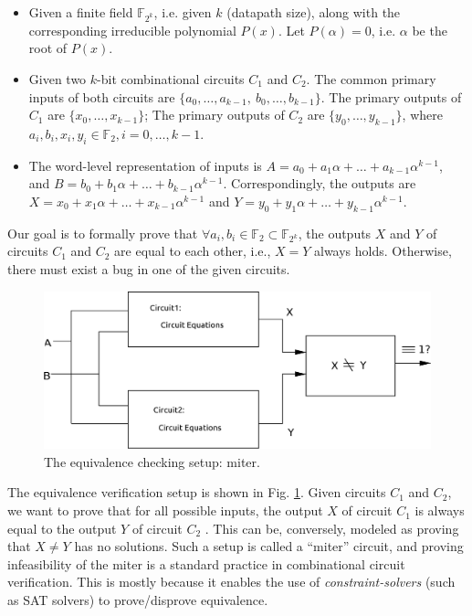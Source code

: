 \begin{itemize}
\item Given a finite field $\mathbb{F}_{2^k}$, i.e. given $k$ (datapath size), along with the
  corresponding irreducible polynomial $P(x)$. Let $P(\alpha) = 0$,
  i.e. $\alpha$ be the root of $P(x)$.   
\item  Given two $k$-bit combinational circuits $C_{1}$ and $C_{2}$. 
		The common primary inputs of both circuits are $\{a_0,
                \dots, a_{k-1}, ~b_0,\dots, b_{k-1}\}$.  
		The primary outputs of $C_{1}$ are $\{x_0, \dots, x_{k-1}\}$;
		The primary outputs of $C_{2}$ are $\{y_0, \dots, y_{k-1}\}$, 
		where $a_i, b_i, x_i, y_i\in \mathbb{F}_2, i = 0, \dots, k-1$.

\item		The word-level representation of inputs is $A = a_0 +
  a_1 \alpha + \dots + a_{k-1}\alpha^{k-1}$, and $B = b_0 + b_1 \alpha
  + \dots + b_{k-1}\alpha^{k-1}$.  Correspondingly, the outputs are
		$X = x_0 + x_1\alpha  + \dots +  x_{k-1}\alpha^{k-1}$
                and $Y = y_0 + y_1\alpha  + \dots +
                y_{k-1}\alpha^{k-1}$. 
\end{itemize}
Our goal is to formally prove that $\forall a_{i},b_{i} \in
\mathbb{F}_{2} \subset \mathbb{F}_{2^k}$, the outputs $X$ and $Y$ of
circuits $C_{1}$ and $C_{2}$ are equal to each other,  i.e., $ X=Y$
always holds. Otherwise, there must exist a bug in one of the given
circuits.   


\begin{figure}[htb]
\centerline{
\includegraphics[scale=0.3]{./figures/miter.eps}
}
\caption{The equivalence checking setup: miter.}
\label{fig:miter}
\end{figure}

The equivalence verification setup is shown in Fig. \ref{fig:miter}. 
Given circuits $C_{1}$ and $C_{2}$, 
we want to prove that for all possible inputs, 
the output $X$ of circuit $C_{1}$ is always equal to the output $Y$ of circuit $C_{2}$ . 
This can be, conversely, modeled as proving that $X \neq Y$ has no
solutions. Such a setup is called a ``miter'' circuit, and proving
infeasibility of the miter is a standard practice in combinational
circuit verification. This is mostly because it enables the use of
{\it constraint-solvers} (such as SAT solvers) to prove/disprove
equivalence.  


